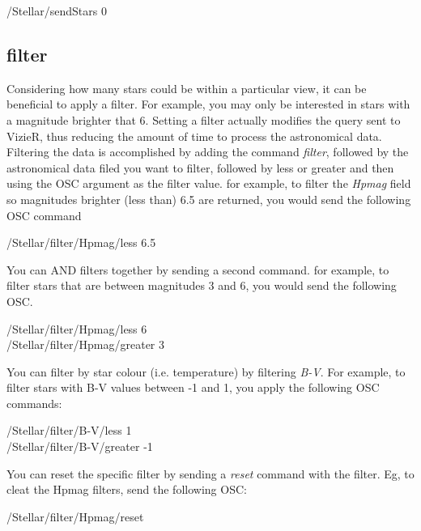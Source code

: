  \begin{syntax}	
	\medskip
	/Stellar/sendStars 0
	\medskip
\end{syntax}  

\subsection{filter}   
Considering how many stars could be within a particular view, it can be beneficial to apply a filter.  For example, you may only be interested in stars with a magnitude brighter that 6. Setting a filter actually modifies the query sent to VizieR, thus reducing the amount of time to process the astronomical data.
Filtering the data is accomplished by adding the command \textit{filter}, followed by the astronomical data filed you want to filter, followed by less or greater and then using the OSC argument as the filter value.  for example, to filter the \textit{Hpmag} field so magnitudes brighter (less than) 6.5 are returned, you would send the following OSC command
   
    \begin{syntax}	   
   	\medskip
   	/Stellar/filter/Hpmag/less 6.5
   	\medskip
   \end{syntax}  

You can AND filters together by sending a second command. for example, to filter stars that are between magnitudes 3 and 6, you would send the following OSC.
    \begin{syntax}	 
	\medskip
	/Stellar/filter/Hpmag/less 6\\
	/Stellar/filter/Hpmag/greater 3
	\medskip
\end{syntax}  

You can filter by star colour (i.e. temperature) by filtering \textit{B-V}. For example, to filter stars with  B-V values between -1 and 1, you apply the following OSC commands:  
     \begin{syntax}	   
 	\medskip
 	/Stellar/filter/B-V/less 1\\
 	/Stellar/filter/B-V/greater -1
 	\medskip
\end{syntax}  

You can reset the specific filter by sending a \textit{reset} command with the filter. Eg, to cleat the Hpmag filters, send the following OSC:  
    \begin{syntax}	
	\medskip
	/Stellar/filter/Hpmag/reset
	\medskip
\end{syntax}  
	\medskip

